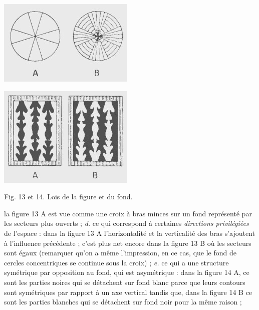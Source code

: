 {\begin{minipage}[c]{.45\linewidth}
\begin{center}
\includegraphics[scale=0.7]{./05_sensible/013}
\end{center}
\end{minipage}
\hfill
\begin{minipage}[c]{.45\linewidth}
\begin{center}
\includegraphics[scale=0.7]{./05_sensible/014}
\end{center}
\end{minipage}
\begin{center}
Fig. 13 et 14. Lois de la figure et du fond.
\end{center}

la figure 13 A est vue comme une croix
à bras minces sur un fond représenté par les secteurs plus ouverts ; {\it d.} ce qui
correspond à certaines {\it directions privilégiées} de l’espace : dans la figure 13 A
l'horizontalité et la verticalité des bras s’ajoutent à l'influence précédente ;
c'est plus net encore dans la figure 13 B où les secteurs sont égaux (remarquer
qu’on a même l'impression, en ce cas, que le fond de cercles concentriques
se continue sous la croix) ;
 {\it e.} ce qui a une structure symétrique par
opposition au fond, qui est asymétrique : dans la figure 14 A, ce sont les
parties noires qui se détachent sur fond blanc parce que leurs contours
sont symétriques par rapport à un axe vertical tandis que, dans la figure 14 B
ce sont les parties blanches qui se détachent sur fond noir pour la même
raison ;

}
